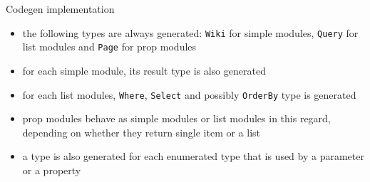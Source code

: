 \documentclass{beamer}
\begin{document}
\begin{frame}{Codegen implementation}
\begin{itemize}
\item the following types are always generated: \lstinline{Wiki} for simple modules, \lstinline{Query} for list modules and \lstinline{Page} for prop modules
\item for each simple module, its result type is also generated
\item for each list modules, \lstinline{Where}, \lstinline{Select} and possibly \lstinline{OrderBy} type is generated
\item prop modules behave as simple modules or list modules in this regard, depending on whether they return single item or a list
\item a type is also generated for each enumerated type that is used by a parameter or a property
\end{itemize}
\end{frame}
\end{document}
